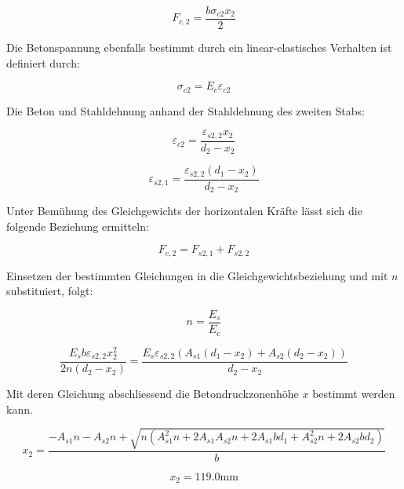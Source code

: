 \documentclass[
  12pt,
  letterpaper,
  egregdoesnotlikesansseriftitles]{scrreprt}
\begin{document}
\begin{equation}F_{c,2} = \frac{b \sigma_{c 2} x_{2}}{2}\end{equation}

Die Betonspannung ebenfalls bestimmt durch ein linear-elastisches
Verhalten ist definiert durch:

\begin{equation}\sigma_{c 2} = E_{c} \varepsilon_{c2}\end{equation}

Die Beton und Stahldehnung anhand der Stahldehnung des zweiten Stabs:

\begin{equation}\varepsilon_{c2} = \frac{\varepsilon_{s2,2} x_{2}}{d_{2} - x_{2}}\end{equation}

\begin{equation}\varepsilon_{s2,1} = \frac{\varepsilon_{s2,2} \left(d_{1} - x_{2}\right)}{d_{2} - x_{2}}\end{equation}

Unter Bemühung des Gleichgewichts der horizontalen Kräfte lässt sich die
folgende Beziehung ermitteln:

\begin{equation}F_{c,2} = F_{s2,1} + F_{s2,2}\end{equation}

Einsetzen der bestimmten Gleichungen in die Gleichgewichtsbeziehung und
mit \(n\) substituiert, folgt:

\begin{equation}n = \frac{E_{s}}{E_{c}}\end{equation}

\begin{equation}\frac{E_{s} b \varepsilon_{s2,2} x_{2}^{2}}{2 n \left(d_{2} - x_{2}\right)} = \frac{E_{s} \varepsilon_{s2,2} \left(A_{s 1} \left(d_{1} - x_{2}\right) + A_{s 2} \left(d_{2} - x_{2}\right)\right)}{d_{2} - x_{2}}\end{equation}

Mit deren Gleichung abschliessend die Betondruckzonenhöhe \(x\) bestimmt
werden kann.

\begin{equation}x_{2} = \frac{- A_{s 1} n - A_{s 2} n + \sqrt{n \left(A_{s 1}^{2} n + 2 A_{s 1} A_{s 2} n + 2 A_{s 1} b d_{1} + A_{s 2}^{2} n + 2 A_{s 2} b d_{2}\right)}}{b}\end{equation}

\begin{equation}x_{2} = 119.0 \text{mm}\end{equation}
\end{document}
